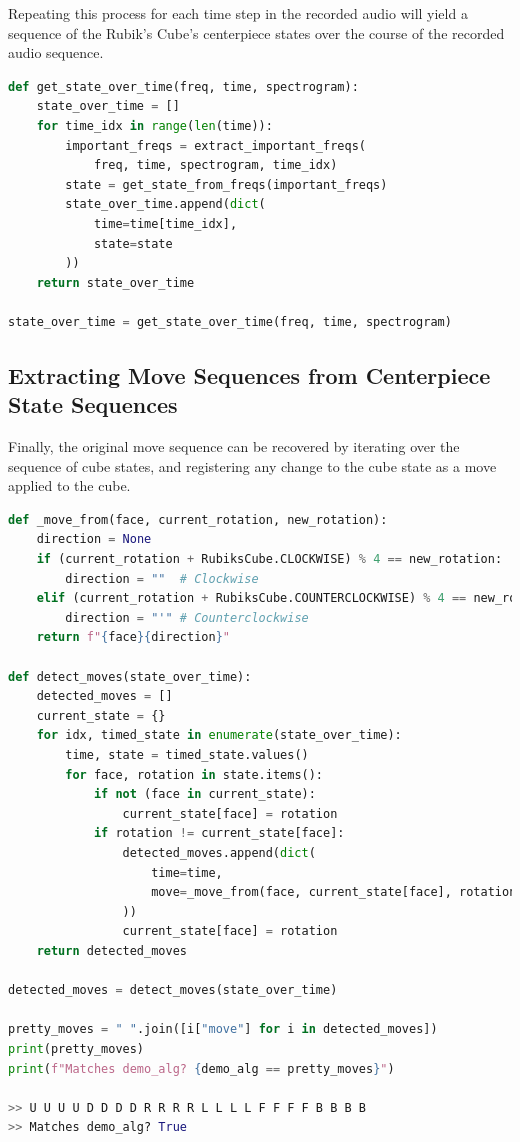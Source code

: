 Repeating this process for each time step in the recorded audio will yield a sequence of the Rubik's Cube's centerpiece states over the course of the recorded audio sequence.

\begin{lstlisting}[language=Python]
def get_state_over_time(freq, time, spectrogram):
    state_over_time = []
    for time_idx in range(len(time)):
        important_freqs = extract_important_freqs(
            freq, time, spectrogram, time_idx)
        state = get_state_from_freqs(important_freqs)
        state_over_time.append(dict(
            time=time[time_idx],
            state=state
        ))
    return state_over_time

state_over_time = get_state_over_time(freq, time, spectrogram)
\end{lstlisting}

\newpage
\subsection{Extracting Move Sequences from Centerpiece State Sequences}
\label{subsec:extract-moves}
Finally, the original move sequence can be recovered by iterating over the sequence of cube states, and registering any change to the cube state as a move applied to the cube.

\begin{lstlisting}[language=Python]
def _move_from(face, current_rotation, new_rotation):
    direction = None
    if (current_rotation + RubiksCube.CLOCKWISE) % 4 == new_rotation:
        direction = ""  # Clockwise
    elif (current_rotation + RubiksCube.COUNTERCLOCKWISE) % 4 == new_rotation:
        direction = "'" # Counterclockwise
    return f"{face}{direction}"

def detect_moves(state_over_time):
    detected_moves = []
    current_state = {}
    for idx, timed_state in enumerate(state_over_time):
        time, state = timed_state.values()
        for face, rotation in state.items():
            if not (face in current_state):
                current_state[face] = rotation
            if rotation != current_state[face]:
                detected_moves.append(dict(
                    time=time,
                    move=_move_from(face, current_state[face], rotation)
                ))
                current_state[face] = rotation
    return detected_moves

detected_moves = detect_moves(state_over_time)

pretty_moves = " ".join([i["move"] for i in detected_moves])
print(pretty_moves)   
print(f"Matches demo_alg? {demo_alg == pretty_moves}") 

>> U U U U D D D D R R R R L L L L F F F F B B B B
>> Matches demo_alg? True
\end{lstlisting}

